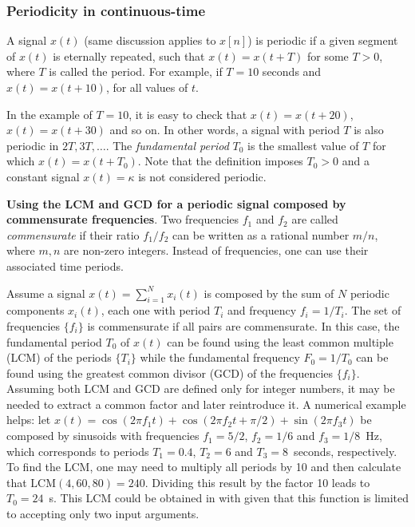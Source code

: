 \subsubsection{Periodicity in continuous-time}
A signal $x(t)$ (same discussion applies to $x[n]$) is periodic if a given segment of $x(t)$ is eternally repeated, such that $x(t) = x(t+T)$ for some $T>0$, where $T$ is called the period. For example, if $T=10$ seconds and $x(t)=x(t+10)$, for all values of $t$.

In the example of $T=10$, it is easy to check that $x(t)=x(t+20)$, $x(t)=x(t+30)$ and so on. In other words, a signal with period $T$ is also periodic in $2T, 3T,\ldots$. The \emph{fundamental period} $T_0$ is the smallest value of $T$ for which $x(t) = x(t+T_0)$. Note that the definition imposes $T_0>0$ and a constant signal $x(t)=\kappa$ is not considered periodic.

\bExample \textbf{Using the LCM and GCD for a periodic signal composed by commensurate frequencies}.
\label{ex:commensurate}
Two frequencies $f_1$ and $f_2$ are called \emph{commensurate} if their ratio $f_1/f_2$ can
be written as a rational number $m/n$, where $m,n$ are non-zero integers. Instead of frequencies, one can use their associated time periods. 

Assume a signal $x(t)=\sum_{i=1}^N x_i(t)$  is composed by the sum of $N$ periodic components 
$x_i(t)$, each one with period $T_i$ and frequency $f_i=1/T_i$. The set of frequencies $\{f_i\}$
is commensurate if all pairs are commensurate. In this case, the fundamental 
period $T_0$ of $x(t)$ can be found
using the least common multiple (LCM) of the periods $\{T_i\}$ while the fundamental frequency $F_0=1/T_0$ can 
be found using the greatest common divisor (GCD) of the frequencies $\{f_i\}$. Assuming both LCM
and GCD are defined only for integer numbers, it may be needed to extract a common factor and later
reintroduce it. A numerical example helps: let $x(t)=\cos(2\pi f_1 t)+\cos(2\pi f_2 t + \pi/2)+\sin(2\pi f_3 t)$ be composed by sinusoids with frequencies $f_1=5/2$, $f_2=1/6$ and $f_3=1/8$~Hz, which
corresponds to periods $T_1=0.4$, $T_2=6$ and $T_3=8$~seconds, respectively.
To find the LCM, one may need to multiply all periods by 10 and then calculate that 
$\textrm{LCM}(4,60,80)=240$. Dividing this result by the factor 10 leads to $T_0=24$~s.
This LCM could be obtained in {\matlab} with  given that this function
is limited to accepting only two input arguments.
\eExample

